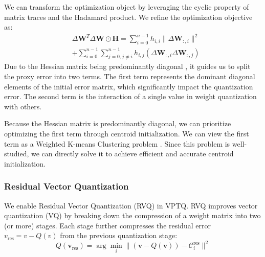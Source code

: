 We can transform the optimization object by leveraging the cyclic property of matrix traces and the Hadamard product. We refine the optimization objective as:
\begin{equation*}
    \begin{aligned}
        &   \Delta \mathbf{W}^T \Delta \mathbf{W} \odot \mathbf{H} 
            = \sum_{i=0}^{n-1} h_{i,i} \|\Delta \mathbf{W}_{:,i} \|^2 \\ 
        &   + \sum_{i=0}^{n-1} \sum_{j=0,j \neq i }^{n-1} h_{i,j} (\Delta \mathbf{W}_{:,i} \Delta \mathbf{W}_{:,j})
    \end{aligned}
    \label{eq:proxy_error}
\end{equation*}
Due to the Hessian matrix being predominantly diagonal \cite{hessia_diag}, it guides us to split the proxy error into two terms. The first term represents the dominant diagonal elements of the initial error matrix, which significantly impact the quantization error. 
The second term is the interaction of a single value in weight quantization with others. 

Because the Hessian matrix is predominantly diagonal, we can prioritize optimizing the first term through centroid initialization. We can view the first term as a Weighted K-means Clustering problem \citep{weighted_kmeans, weighted_kmeans2, weighted_kmeans3}. 
Since this problem is well-studied, we can directly solve it to achieve efficient and accurate centroid initialization.




















\subsubsection{Residual Vector Quantization}
We enable Residual Vector Quantization (RVQ) \citep{residual_vq, residual_vp2} in VPTQ. RVQ improves vector quantization (VQ) by breaking down the compression of a weight matrix into two (or more) stages. 
Each stage further compresses the residual error $v_{\text{res}} = v - Q(v)$ from the previous quantization stage:
\begin{equation*}
    Q(\boldsymbol{v}_{\text{res}}) = \arg \min_{i} \| (\boldsymbol{v} - Q(\boldsymbol{v})) - \mathcal{C}^{\text{res}}_{i} \|^2
\end{equation*}

